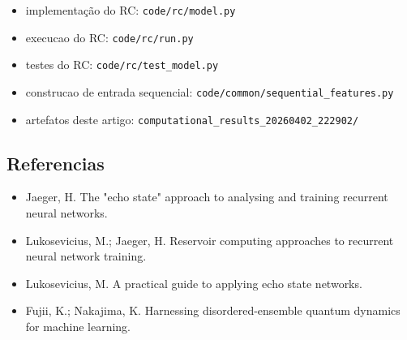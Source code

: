 \documentclass[12pt]{article}
\providecommand{\tightlist}{%
          \setlength{\itemsep}{0pt}\setlength{\parskip}{0pt}}
\begin{document}
\begin{itemize}
\tightlist
\item
  implementação do RC: \texttt{code/rc/model.py}
\item
  execucao do RC: \texttt{code/rc/run.py}
\item
  testes do RC: \texttt{code/rc/test\_model.py}
\item
  construcao de entrada sequencial: \texttt{code/common/sequential\_features.py}
\item
  artefatos deste artigo: \texttt{computational\_results\_20260402\_222902/}
\end{itemize}

\subsection{Referencias}\label{referencias}

\begin{itemize}
\tightlist
\item
  Jaeger, H. The "echo state" approach to analysing and training recurrent neural networks.
\item
  Lukosevicius, M.; Jaeger, H. Reservoir computing approaches to recurrent neural network training.
\item
  Lukosevicius, M. A practical guide to applying echo state networks.
\item
  Fujii, K.; Nakajima, K. Harnessing disordered-ensemble quantum dynamics for machine learning.
\end{itemize}

        
\end{document}
